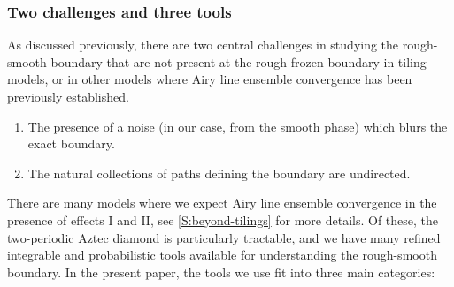 \documentclass[11pt,twoside]{amsart}
\theoremstyle{plain}
\numberwithin{quest}{section}
\theoremstyle{remark}
\numberwithin{rem}{section}
\theoremstyle{definition}
\begin{document}
	\subsubsection*{Two challenges and three tools} \qquad
	As discussed previously, there are two central challenges in studying the rough-smooth boundary that are not present at the rough-frozen boundary in tiling models, or in other models where Airy line ensemble convergence has been previously established.
	\begin{enumerate}[label=\Roman*.]
		\item The presence of a noise (in our case, from the smooth phase) which blurs the exact boundary. 
		\item The natural collections of paths defining the boundary are undirected. 
	\end{enumerate}
   There are many models where we expect Airy line ensemble convergence in the presence of effects I and II, see \cref{S:beyond-tilings} for more details. Of these, the two-periodic Aztec diamond is particularly tractable, and we have many refined integrable and probabilistic tools available for understanding the rough-smooth boundary. In the present paper, the tools we use fit into three main categories: 
\end{document}
